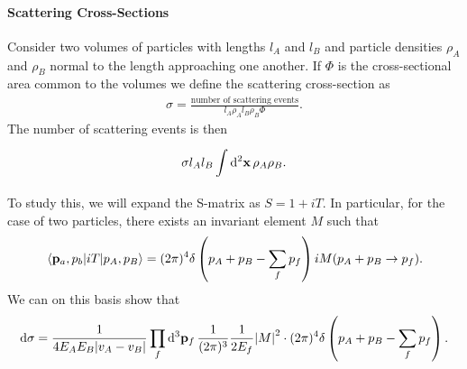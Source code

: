 \paragraph{Scattering Cross-Sections}
Consider two volumes of particles with lengths $l_{A}$ and $l_{B}$ and particle densities $\rho_{A}$ and $\rho_{B}$ normal to the length approaching one another. If $\Phi$ is the cross-sectional area common to the volumes we define the scattering cross-section as
\begin{align*}
	\sigma = \frac{\text{number of scattering events}}{l_{A}\rho_{A}l_{B}\rho_{B}\Phi}.
\end{align*}
The number of scattering events is then
\begin{align*}
	\sigma l_{A}l_{B}\int\limits_{}^{}\dd[2]{\vb{x}}\rho_{A}\rho_{B}.
\end{align*}
To study this, we will expand the S-matrix as $S = 1 + iT$. In particular, for the case of two particles, there exists an invariant element $M$ such that
\begin{align*}
	\mel{\vb{p}_{a}, p_{b}}{iT}{p_{A}, p_{B}} = (2\pi)^{4}\delta\left(p_{A} + p_{B} - \sum\limits_{f}p_{f}\right)iM(p_{A} + p_{B} \to p_{f}).
\end{align*}
We can on this basis show that
\begin{align*}
	\dd{\sigma} = \frac{1}{4E_{A}E_{B}\abs{v_{A} - v_{B}}}\prod\limits_{f}\dd[3]{\vb{p}_{f}}\frac{1}{(2\pi)^{3}}\frac{1}{2E_{f}}\abs{M}^{2}\cdot (2\pi)^{4}\delta\left(p_{A} + p_{B} - \sum\limits_{f}p_{f}\right).
\end{align*}